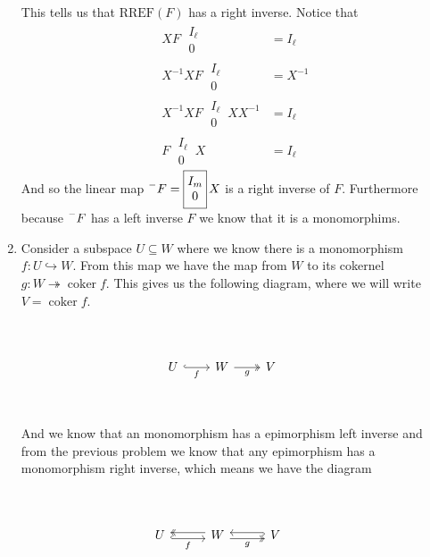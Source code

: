 \documentclass[12pt]{amsart}
\theoremstyle{definition}
\DeclareMathOperator{\coker}{\mathrm{coker}}
\newcommand{\se}{\subseteq}
\begin{document}
\begin{enumerate}
This tells us that $\text{RREF}(F)$ has a right inverse. Notice that
\begin{align*}
    XF\;\boxed{\begin{matrix} I_\ell \\ 0\end{matrix}}&=I_\ell\\
    X^{-1}XF\;\boxed{\begin{matrix} I_\ell \\ 0\end{matrix}}&=X^{-1}\\
    X^{-1}XF\;\boxed{\begin{matrix} I_\ell \\ 0\end{matrix}}\, XX^{-1}&=I_\ell\\
    F\;\boxed{\begin{matrix} I_\ell \\ 0\end{matrix}}\, X&=I_\ell
\end{align*}
And so the linear map $\prescript{-}{}{F}=\boxed{\begin{matrix} I_m \\ 0\end{matrix}}\,X$ is a right inverse of $F$. Furthermore because $\prescript{-}{}{F}$ has a left inverse $F$ we know that it is a monomorphims.\\

\item Consider a subspace $U\se W$ where we know there is a monomorphism $f:U\hookrightarrow W$. From this map we have the map from $W$ to its cokernel $g:W\twoheadrightarrow \coker f$. This gives us the following diagram, where we will write $V=\coker f$.

\[\begin{tikzcd}[row sep=1cm, column sep=.75cm]
     & \\
      U\arrow[r,hook, "f"'] & W \arrow[r,twoheadrightarrow, "g"'] & V
      &\\
    \end{tikzcd}\]

And we know that an monomorphism has a epimorphism left inverse and from the previous problem we know that any epimorphism has a monomorphism right inverse, which means we have the diagram

\[\begin{tikzcd}[row sep=1cm, column sep=1cm]
     & \\
      U\arrow[r,hook, shift right, "f"'] & W \arrow[l,twoheadrightarrow, shift right]\arrow[r,twoheadrightarrow, shift right, "g"'] & V \arrow[l,hook, shift right]
      &\\
    \end{tikzcd}\]


\end{enumerate}
\end{document}
